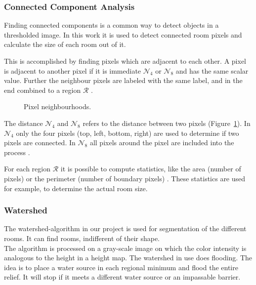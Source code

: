 \subsubsection{Connected Component Analysis}
\label{sub:ConnectedComponentAnalysis}
Finding connected components is a common way to detect objects in a thresholded image. In this work it is used to detect connected room pixels and calculate the size of each room out of it.

This is accomplished by finding pixels which are adjacent to each other. A pixel is adjacent to another pixel if it is immediate $\mathcal{N}_4$ or $\mathcal{N}_8$ and has the same scalar value. Further the neighbour pixels are labeled with the same label, and in the end combined to a region $\mathcal{R}$ \citep[Section 3.3.4]{szeliski_2011}.

\begin{figure}[H]
	\centering
	\hfill
	\caption{Pixel neighbourhoods.}
	\label{fig:pixel_neighbourhood}
\end{figure}

The distance $\mathcal{N}_4$ and $\mathcal{N}_8$ refers to the distance between two pixels (Figure~\ref{fig:pixel_neighbourhood}). In $\mathcal{N}_4$ only the four pixels (top, left, bottom, right) are used to determine if two pixels are connected. In $\mathcal{N}_8$ all pixels around the pixel are included into the process \citep{burger_burge_2016}.

For each region $\mathcal{R}$ it is possible to compute statistics, like the area (number of pixels) or the perimeter (number of boundary pixels) \citep[Section 3.3.4]{szeliski_2011}. These statistics are used for example, to determine the actual room size.

\subsubsection{Watershed}
\label{subsub:watershed}
The watershed-algorithm in our project is used for segmentation of the different rooms. It can find rooms, indifferent of their shape.
\\
The algorithm is processed on a gray-scale image on which the color intensity is analogous to the height in a height map. The watershed in use does flooding. The idea is to place a water source in each regional minimum and flood the entire relief. It will stop if it meets a different water source or an impassable barrier.


